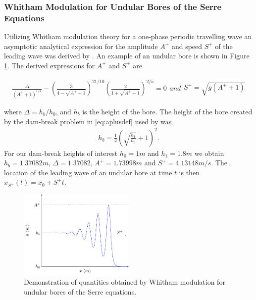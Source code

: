 \documentclass[times]{elsarticle}
\begin{document}
\subsubsection{Whitham Modulation for Undular Bores of the Serre Equations}
Utilizing Whitham modulation theory for a one-phase periodic travelling wave an asymptotic analytical expression for the amplitude $A^+$ and speed $S^+$ of the leading wave was derived by \citet{El-etal-2006}. An example of an undular bore is shown in Figure \ref{fig:Serreanadiagram}.
The derived expressions for $A^+$ and $S^+$ are
\begin{linenomath*}
	\begin{subequations}
		\begin{gather}
		\frac{\Delta}{\left(A^+ + 1\right)^{1/4}} - \left(\frac{3}{4 -  \sqrt{A^+ + 1}}\right)^{21/10} \left(\frac{2}{1 + \sqrt{A^+ + 1}}\right)^{2/5} = 0
		\label{eq:aplusdef}
		\end{gather}
		and
		\begin{gather}
		S^+ = \sqrt{g \left(A^+ + 1\right)}
		\label{eq:splusdef}
		\end{gather}
		\label{eq:ELWhitMod}	
	\end{subequations}
\end{linenomath*}
where $\Delta = h_b / h_0$, and $h_b$ is the height of the bore. The height of the bore created by the dam-break problem in \eqref{eq:aplusdef} used by \citet{El-etal-2006} was
\begin{gather*}
\label{eqn:hrdef}
h_b = \frac{1}{4}\left(\sqrt{\frac{h_1}{h_0}} + 1\right)^2.
\end{gather*} 
For our dam-break heights of interest $h_0 = 1m$ and $h_1 = 1.8m$ we obtain $h_b = 1.37082m$, $\Delta = 1.37082$, $A^+ = 1.73998m$ and $S^+ = 4.13148m/s$. The location of the leading wave of an undular bore at time $t$ is then $x_{S^+}(t) = x_0 + S^+ t$.


\begin{figure}
	\centering
	\includegraphics[width=0.5\textwidth]{pics/explainers/SERREex.pdf}
	\caption{Demonstration of quantities obtained by Whitham modulation for undular bores of the Serre equations.}
	\label{fig:Serreanadiagram}
\end{figure}
\end{document}
